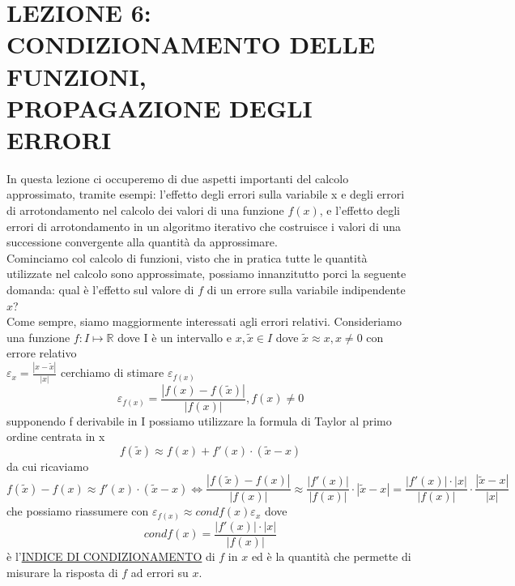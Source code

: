 \documentclass[12pt]{article}
\begin{document}
\section*{LEZIONE 6: CONDIZIONAMENTO DELLE FUNZIONI, \\ PROPAGAZIONE DEGLI ERRORI}
In questa lezione ci occuperemo di due aspetti importanti del calcolo approssimato, tramite esempi: l'effetto degli errori sulla variabile x e degli errori di arrotondamento nel calcolo dei valori di una funzione $f(x)$, e l'effetto degli errori di arrotondamento in un algoritmo iterativo che costruisce i valori di una successione convergente alla quantità da approssimare.\\
Cominciamo col calcolo di funzioni, visto che in pratica tutte le quantità utilizzate nel calcolo sono approssimate, possiamo innanzitutto porci la seguente domanda: qual è l'effetto sul valore di $f$ di un errore sulla variabile indipendente $x$?\\
Come sempre, siamo maggiormente interessati agli errori relativi. Consideriamo una funzione $f: I \mapsto \mathbb{R}$ dove I è un intervallo e $x, \tilde{x} \in I$ dove $\tilde{x} \approx x, x \neq 0$ con errore relativo\\
$\varepsilon_x = \frac{|x-\tilde{x}|}{|x|}$
cerchiamo di stimare $\varepsilon_{f(x)}$\\
\begin{equation}
    \varepsilon_{f(x)} = \frac{|f(x)-f(\tilde{x})|}{|f(x)|}, f(x) \neq 0
\end{equation}
supponendo f derivabile in I possiamo utilizzare la formula
di Taylor al primo ordine centrata in x
\begin{equation}
        f(\tilde{x}) \approx f(x) + f'(x)\cdot (\tilde{x}-x)
\end{equation}
da cui ricaviamo
\begin{equation}
        f(\tilde{x})-f(x) \approx f'(x)\cdot (\tilde{x}-x) \iff
        \frac{|f(\tilde{x})-f(x)|}{|f(x)|} \approx \frac{|f'(x)|}{|f(x)|} \cdot |\tilde{x}-x| = \frac{|f'(x)| \cdot |x|}{|f(x)|} \cdot \frac{|\tilde{x}-x|}{|x|}
\end{equation}
che possiamo riassumere con $\varepsilon_{f(x)} \approx condf(x) \varepsilon_x$ dove
\begin{equation}
    condf(x)=\frac{|f'(x)|\cdot|x|}{|f(x)|}
\end{equation}
è l'\underline{INDICE DI CONDIZIONAMENTO} di $f$ in $x$ ed è la quantità che permette di misurare la risposta di $f$ ad errori su $x$.\\
\end{document}
